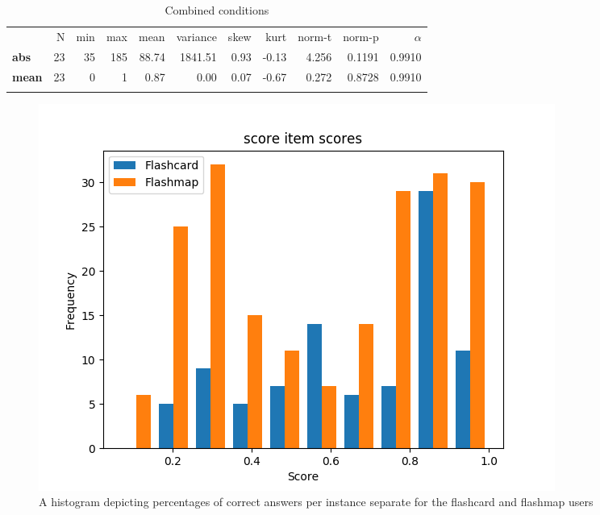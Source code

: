 \begin{longtable}[c]{@{}lrrrrrrrrrr@{}}
\caption{Combined conditions}
\endfirsthead
\toprule\addlinespace
& N & min & max & mean & variance & skew & kurt & norm-t &
norm-p & $\alpha$
\\\addlinespace
\midrule
\textbf{abs} & 23 & 35 & 185 & 88.74 & 1841.51 & 0.93 & -0.13 & 4.256 & 0.1191 & 0.9910
\\\addlinespace
\textbf{mean} & 23 & 0 & 1 & 0.87 & 0.00 & 0.07 & -0.67 & 0.272 & 0.8728
& 0.9910
\\\addlinespace
\bottomrule
    \label{tab:score_gen}
\end{longtable}

\begin{figure}
    \centering
    \includegraphics[width=.7\textwidth]{img/score_diff.png}
    \caption{A histogram depicting percentages of correct answers per instance separate for the flashcard and flashmap users}
    \label{fig:score_diff}
\end{figure}

